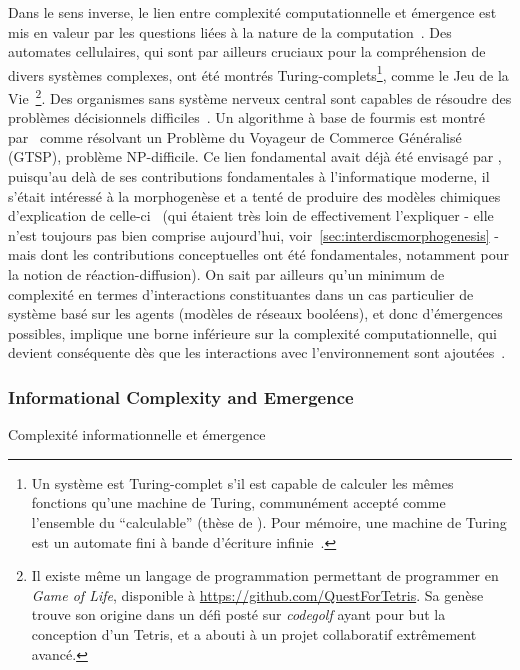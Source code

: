 

Dans le sens inverse, le lien entre complexité computationnelle et émergence est mis en valeur par les questions liées à la nature de la computation~\cite{moore2011nature}. Des automates cellulaires, qui sont par ailleurs cruciaux pour la compréhension de divers systèmes complexes, ont été montrés Turing-complets\footnote{Un système est Turing-complet s'il est capable de calculer les mêmes fonctions qu'une machine de Turing, communément accepté comme l'ensemble du ``calculable'' (thèse de ). Pour mémoire, une machine de Turing est un automate fini à bande d'écriture infinie~\cite{moore2011nature}.}, comme le Jeu de la Vie~\cite{beer2004autopoiesis}\footnote{Il existe même un langage de programmation permettant de programmer en \emph{Game of Life}, disponible à \url{https://github.com/QuestForTetris}. Sa genèse trouve son origine dans un défi posté sur \emph{codegolf} ayant pour but la conception d'un Tetris, et a abouti à un projet collaboratif extrêmement avancé.}. Des organismes sans système nerveux central sont capables de résoudre des problèmes décisionnels difficiles~\cite{reid2016decision}. Un algorithme à base de fourmis est montré par~\cite{Pintea2017} comme résolvant un Problème du Voyageur de Commerce Généralisé (GTSP), problème NP-difficile. Ce lien fondamental avait déjà été envisagé par , puisqu'au delà de ses contributions fondamentales à l'informatique moderne, il s'était intéressé à la morphogenèse et a tenté de produire des modèles chimiques d'explication de celle-ci~\cite{turing1952chemical} (qui étaient très loin de effectivement l'expliquer - elle n'est toujours pas bien comprise aujourd'hui, voir~\ref{sec:interdiscmorphogenesis} - mais dont les contributions conceptuelles ont été fondamentales, notamment pour la notion de réaction-diffusion). On sait par ailleurs qu'un minimum de complexité en termes d'interactions constituantes dans un cas particulier de système basé sur les agents (modèles de réseaux booléens), et donc d'émergences possibles, implique une borne inférieure sur la complexité computationnelle, qui devient conséquente dès que les interactions avec l'environnement sont ajoutées~\cite{tovsic2017boolean}.




\subsubsection{Informational Complexity and Emergence}{Complexité informationnelle et émergence}

